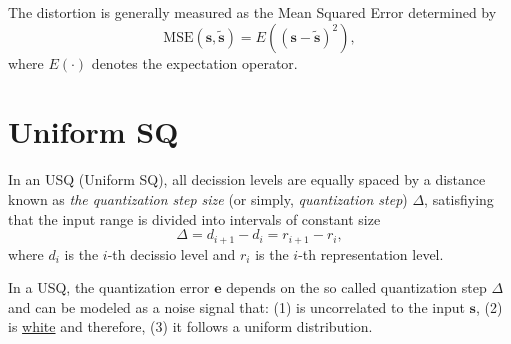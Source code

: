 The distortion is generally measured as the Mean Squared Error determined by
\begin{equation}
  \text{MSE}({\mathbf s}, \tilde{\mathbf s}) = E(({\mathbf s} - \tilde{\mathbf s})^2),
  \label{eq:MSE}
\end{equation}
where $E(\cdot)$ denotes the expectation operator.


\section{Uniform SQ}

In an USQ (Uniform SQ), all decission levels are equally spaced by a
distance known as \emph{the quantization step size} (or simply,
\emph{quantization step}) \(\Delta\), satisfiying that the input range
is divided into intervals of constant size
\begin{equation}
  \Delta=d_{i+1}-d_i=r_{i+1}-r_i,
\end{equation}
where $d_i$ is the $i$-th decissio level and $r_i$ is the $i$-th
representation level.

In a USQ, the quantization error ${\mathbf e}$ depends on the so
called quantization step $\Delta$ and can be modeled as a noise signal
that: (1) is uncorrelated to the input ${\mathbf s}$, (2) is
\href{https://en.wikipedia.org/wiki/White_noise}{white} and therefore,
(3) it follows a uniform distribution.



